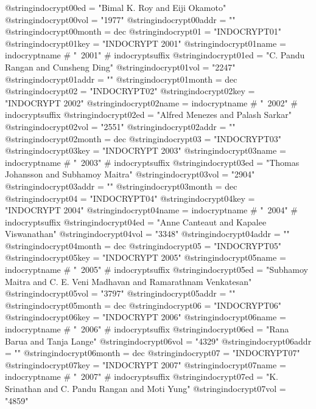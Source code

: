 @string{indocrypt00ed =         "Bimal K. Roy and Eiji Okamoto"}
@string{indocrypt00vol =        "1977"}
@string{indocrypt00addr =       ""}
@string{indocrypt00month =      dec}
@string{indocrypt01 =           "INDOCRYPT01"}
@string{indocrypt01key =        "INDOCRYPT 2001"}
@string{indocrypt01name =       indocryptname # "~2001" # indocryptsuffix}
@string{indocrypt01ed =         "C. Pandu Rangan and Cunsheng Ding"}
@string{indocrypt01vol =        "2247"}
@string{indocrypt01addr =       ""}
@string{indocrypt01month =      dec}
@string{indocrypt02 =           "INDOCRYPT02"}
@string{indocrypt02key =        "INDOCRYPT 2002"}
@string{indocrypt02name =       indocryptname # "~2002" # indocryptsuffix}
@string{indocrypt02ed =         "Alfred Menezes and Palash Sarkar"}
@string{indocrypt02vol =        "2551"}
@string{indocrypt02addr =       ""}
@string{indocrypt02month =      dec}
@string{indocrypt03 =           "INDOCRYPT03"}
@string{indocrypt03key =        "INDOCRYPT 2003"}
@string{indocrypt03name =       indocryptname # "~2003" # indocryptsuffix}
@string{indocrypt03ed =         "Thomas Johansson and Subhamoy Maitra"}
@string{indocrypt03vol =        "2904"}
@string{indocrypt03addr =       ""}
@string{indocrypt03month =      dec}
@string{indocrypt04 =           "INDOCRYPT04"}
@string{indocrypt04key =        "INDOCRYPT 2004"}
@string{indocrypt04name =       indocryptname # "~2004" # indocryptsuffix}
@string{indocrypt04ed =         "Anne Canteaut and Kapalee Viswanathan"}
@string{indocrypt04vol =        "3348"}
@string{indocrypt04addr =       ""}
@string{indocrypt04month =      dec}
@string{indocrypt05 =           "INDOCRYPT05"}
@string{indocrypt05key =        "INDOCRYPT 2005"}
@string{indocrypt05name =       indocryptname # "~2005" # indocryptsuffix}
@string{indocrypt05ed =         "Subhamoy Maitra and C. E. Veni Madhavan and Ramarathnam Venkatesan"}
@string{indocrypt05vol =        "3797"}
@string{indocrypt05addr =       ""}
@string{indocrypt05month =      dec}
@string{indocrypt06 =           "INDOCRYPT06"}
@string{indocrypt06key =        "INDOCRYPT 2006"}
@string{indocrypt06name =       indocryptname # "~2006" # indocryptsuffix}
@string{indocrypt06ed =         "Rana Barua and Tanja Lange"}
@string{indocrypt06vol =        "4329"}
@string{indocrypt06addr =       ""}
@string{indocrypt06month =      dec}
@string{indocrypt07 =           "INDOCRYPT07"}
@string{indocrypt07key =        "INDOCRYPT 2007"}
@string{indocrypt07name =       indocryptname # "~2007" # indocryptsuffix}
@string{indocrypt07ed =         "K. Srinathan and C. Pandu Rangan and Moti Yung"}
@string{indocrypt07vol =        "4859"}
